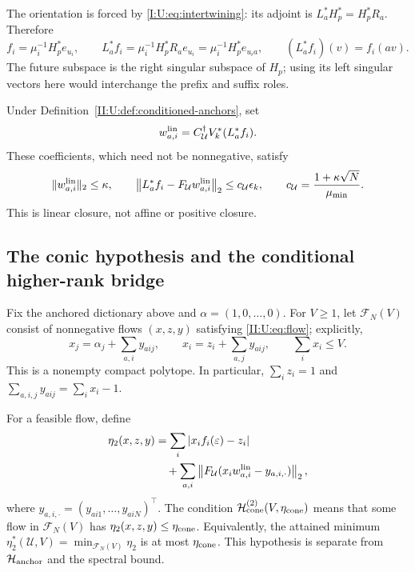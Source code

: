 The orientation is forced by \eqref{I:U:eq:intertwining}: its adjoint is
$L_a^*H_p^*=H_p^*R_a$. Therefore
\begin{equation}
 f_i=\mu_i^{-1}H_p^*e_{u_i},\qquad
 L_a^*f_i=\mu_i^{-1}H_p^*R_ae_{u_i}
 =\mu_i^{-1}H_p^*e_{u_i a},\qquad
 (L_a^*f_i)(v)=f_i(av).
 \label{II:U:eq:anchor-orientation}
\end{equation}
The future subspace is the right singular subspace of $H_p$; using its
left singular vectors here would interchange the prefix and suffix roles.

\begin{lemma}
\label{II:U:lem:signed-anchor-closure}
Under Definition~\ref{II:U:def:conditioned-anchors}, set
\[
 w_{a,i}^{\rm lin}=C_{\mathcal U}^{\dagger}V_k^*(L_a^*f_i).
\]
These coefficients, which need not be nonnegative, satisfy
\begin{equation}
 \|w_{a,i}^{\rm lin}\|_2\le\kappa,\qquad
 \left\|L_a^*f_i-F_{\mathcal U}w_{a,i}^{\rm lin}\right\|_2
 \le c_{\mathcal U}\epsilon_k,\qquad
 c_{\mathcal U}=\frac{1+\kappa\sqrt N}{\mu_{\min}}.
 \label{II:U:eq:signed-anchor-defect}
\end{equation}
This is linear closure, not affine or positive closure.
\end{lemma}


\subsection{The conic hypothesis and the conditional higher-rank bridge}
\label{II:U:sec:conditional-cone-bridge}
Fix the anchored dictionary above and $\alpha=(1,0,\ldots,0)$.
For $V\ge1$, let $\mathcal F_N(V)$ consist of nonnegative flows
$(x,z,y)$ satisfying \eqref{II:U:eq:flow}; explicitly,
\[
 x_j=\alpha_j+\sum_{a,i}y_{aij},\qquad
 x_i=z_i+\sum_{a,j}y_{aij},\qquad \sum_i x_i\le V.
\]
This is a nonempty compact polytope. In particular,
$\sum_i z_i=1$ and $\sum_{a,i,j}y_{aij}=\sum_i x_i-1$.

\begin{definition}
\label{II:U:def:cone-defect}
For a feasible flow, define
\begin{align}
 \eta_2(x,z,y)
 &=\sum_i|x_if_i(\varepsilon)-z_i|\notag\\
 &\quad+\sum_{a,i}
 \left\|F_{\mathcal U}
       (x_iw_{a,i}^{\rm lin}-y_{a,i,\cdot})\right\|_2,
 \label{II:U:eq:cone-defect}
\end{align}
where $y_{a,i,\cdot}=(y_{ai1},\ldots,y_{aiN})^\top$.
The condition $\mathcal H_{\rm cone}^{(2)}(V,\eta_{\rm cone})$
means that some flow in $\mathcal F_N(V)$ has
$\eta_2(x,z,y)\le\eta_{\rm cone}$.
Equivalently, the attained minimum
$\eta_2^*(\mathcal U,V)=\min_{\mathcal F_N(V)}\eta_2$ is at most
$\eta_{\rm cone}$. This hypothesis is separate from
$\mathcal H_{\rm anchor}$ and the spectral bound.
\end{definition}

